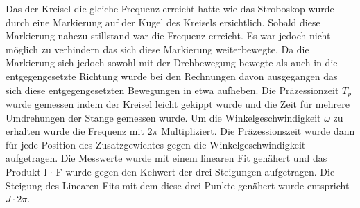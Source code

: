 Das der Kreisel die gleiche Frequenz erreicht hatte wie das Stroboskop wurde durch eine Markierung auf der Kugel des Kreisels ersichtlich. Sobald diese Markierung nahezu stillstand war die Frequenz erreicht. Es war jedoch nicht möglich zu verhindern das sich diese Markierung weiterbewegte. Da die Markierung sich jedoch sowohl mit der Drehbewegung bewegte als auch in die entgegengesetzte Richtung wurde bei den Rechnungen davon ausgegangen das sich diese entgegengesetzten Bewegungen in etwa aufheben. Die Präzessionzeit $T_p$ wurde gemessen indem der Kreisel leicht gekippt wurde und die Zeit für mehrere Umdrehungen der Stange gemessen wurde. Um die Winkelgeschwindigkeit $\omega$ zu erhalten wurde die Frequenz mit $2 \pi$ Multipliziert.
Die Präzessionszeit wurde dann für jede Position des Zusatzgewichtes gegen die Winkelgeschwindigkeit aufgetragen. Die Messwerte wurde mit einem linearen Fit genähert und das Produkt l $\cdot$ F wurde gegen den Kehwert der drei Steigungen aufgetragen. Die Steigung des Linearen Fits mit dem diese drei Punkte genähert wurde entspricht $J \cdot 2 \pi$.